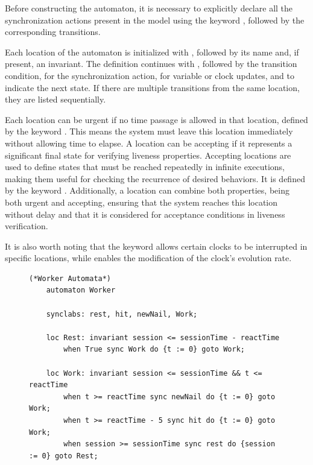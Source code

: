 \begin{itemize}
    Before constructing the automaton, it is necessary to explicitly declare all the synchronization actions present in the model using the keyword , followed by the corresponding transitions.

    Each location of the automaton is initialized with , followed by its name and, if present, an invariant. The definition continues with , followed by the transition condition,  for the synchronization action,  for variable or clock updates, and  to indicate the next state. If there are multiple transitions from the same location, they are listed sequentially.

    Each location can be urgent if no time passage is allowed in that location, defined by the keyword . This means the system must leave this location immediately without allowing time to elapse. A location can be accepting if it represents a significant final state for verifying liveness properties. Accepting locations are used to define states that must be reached repeatedly in infinite executions, making them useful for checking the recurrence of desired behaviors. It is defined by the keyword .
    Additionally, a location can combine both properties, being both urgent and accepting, ensuring that the system reaches this location without delay and that it is considered for acceptance conditions in liveness verification.

    It is also worth noting that the keyword  allows certain clocks to be interrupted in specific locations, while  enables the modification of the clock's evolution rate.

    

    \begin{figure}[H]
    \centering
    \begin{lstlisting}[language=UPPAAL, caption={Construction of the Automata using Worker Automata as Example}, label={lst:VD_example}]
    (*Worker Automata*)
    automaton Worker
    
    synclabs: rest, hit, newNail, Work;
    
    loc Rest: invariant session <= sessionTime - reactTime
      	when True sync Work do {t := 0} goto Work;
    
    loc Work: invariant session <= sessionTime && t <= reactTime
      	when t >= reactTime sync newNail do {t := 0} goto Work;
      	when t >= reactTime - 5 sync hit do {t := 0} goto Work;
      	when session >= sessionTime sync rest do {session := 0} goto Rest;
    

\end{lstlisting}
\end{figure}
\end{itemize}
